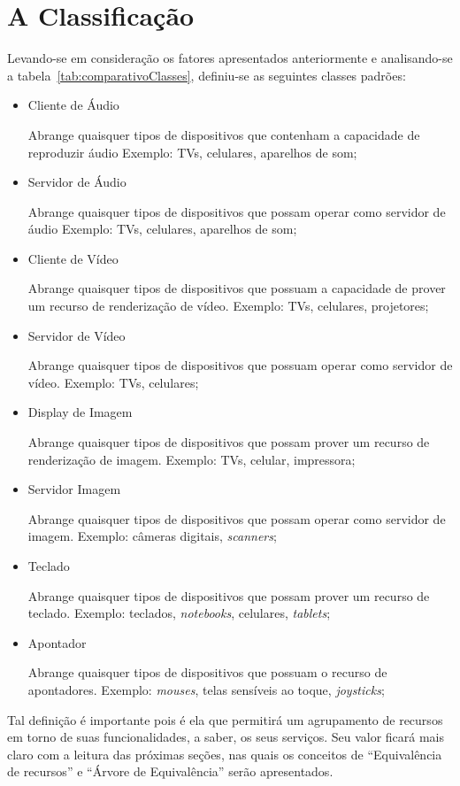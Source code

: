 \section{A Classificação}
\label{sec:Aclassficacao}
Levando-se em consideração os fatores apresentados anteriormente e analisando-se a tabela~\ref{tab:comparativoClasses}, definiu-se as seguintes classes padrões:

\begin{itemize}
	\item Cliente de Áudio
		
		Abrange quaisquer tipos de dispositivos que contenham a capacidade de reproduzir áudio Exemplo: TVs, celulares, aparelhos de som;
	\item Servidor de Áudio
		
		Abrange quaisquer tipos de dispositivos que possam operar como servidor de áudio Exemplo: TVs, celulares, aparelhos de som;
	\item Cliente de Vídeo
		
		Abrange quaisquer tipos de dispositivos que possuam a capacidade de prover um recurso de renderização de vídeo. Exemplo: TVs, celulares, projetores;
	\item Servidor de Vídeo
		
		Abrange quaisquer tipos de dispositivos que possuam operar como servidor de vídeo. Exemplo: TVs, celulares;
	\item Display de Imagem
		
		Abrange quaisquer tipos de dispositivos que possam prover um recurso de renderização de imagem. Exemplo: TVs, celular, impressora;
	\item Servidor Imagem
		
		Abrange quaisquer tipos de dispositivos que possam operar como servidor de imagem. Exemplo: câmeras digitais, \emph{scanners};
	\item Teclado
		
		Abrange quaisquer tipos de dispositivos que possam prover um recurso de teclado. Exemplo: teclados, \emph{notebooks}, celulares, \emph{tablets};
	\item Apontador
		
		Abrange quaisquer tipos de dispositivos que possuam o recurso de apontadores. Exemplo: \emph{mouses}, telas sensíveis ao toque, \emph{joysticks};
\end{itemize}

Tal definição é importante pois é ela que permitirá um agrupamento de recursos em torno de suas funcionalidades, a saber, os seus serviços. Seu valor ficará mais claro com a leitura das próximas seções, nas quais os conceitos de ``Equivalência de recursos'' e ``Árvore de Equivalência'' serão apresentados.


